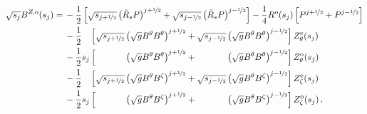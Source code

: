 \begin{align}
  \sqrt{s_j} B^{Z,\mathrm{o}} (s_j)
  =&\, - \frac{1}{2} \left[ \sqrt{s_{j+\half}} \left( \tilde{R}_s P \right)^{j+\half} + \sqrt{s_{j-\half}} \left( \tilde{R}_s P \right)^{j-\half} \right]
       - \frac{1}{4} R^o(s_j) \left[ P^{j+\half} + P^{j-\half} \right] \nonumber \\
  ~&\, - \frac{1}{2} \phantom{s_j} \left[            \sqrt{s_{j+\half}}  \left( \sqrt{g} B^\theta B^\theta \right)^{j+\half}
                                          +          \sqrt{s_{j-\half}}  \left( \sqrt{g} B^\theta B^\theta \right)^{j-\half} \right] Z_\theta^\mathrm{e}(s_j) \nonumber \\
  ~&\, - \frac{1}{2}          s_j  \left[   \phantom{\sqrt{s_{j+\half}}} \left( \sqrt{g} B^\theta B^\theta \right)^{j+\half}
                                          + \phantom{\sqrt{s_{j-\half}}} \left( \sqrt{g} B^\theta B^\theta \right)^{j-\half} \right] Z_\theta^\mathrm{o}(s_j) \nonumber \\
  ~&\, - \frac{1}{2} \phantom{s_j} \left[            \sqrt{s_{j+\half}}  \left( \sqrt{g} B^\theta  B^\zeta \right)^{j+\half}
                                          +          \sqrt{s_{j-\half}}  \left( \sqrt{g} B^\theta  B^\zeta \right)^{j-\half} \right]  Z_\zeta^\mathrm{e}(s_j) \nonumber \\
  ~&\, - \frac{1}{2}          s_j  \left[   \phantom{\sqrt{s_{j+\half}}} \left( \sqrt{g} B^\theta  B^\zeta \right)^{j+\half}
                                          + \phantom{\sqrt{s_{j-\half}}} \left( \sqrt{g} B^\theta  B^\zeta \right)^{j-\half} \right]  Z_\zeta^\mathrm{o}(s_j) \label{eqn:bzmn_o} \, .
\end{align}

